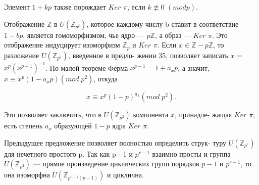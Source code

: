 \begin{mynotice} Элемент $1+kp$ также порождает $Ker$ $\pi$, если $k \not\equiv 0$ \linebreak $(mod p)$. \par

Отображение $\mathbb{Z}$ в $U({{\mathbb{Z}}_{p^{2}}})$, которое каждому числу b ставит в \linebreak соответствие $1-bp$, является гомоморфизмом, чье ядро --- $p \mathbb{Z}$, а \linebreak образ --- $Ker$ $\pi$. 
Это отображение индуцирует изоморфизм $\mathbb{Z}_{p}$ и \linebreak $Ker$ $\pi$. Если $x\in\mathbb{Z} - p\mathbb{Z}$, то разложение $U(\mathbb{Z}_{p^{2}})$, введенное в предло- \linebreak жении 35, позволяет записать $x$ = $x^{p}(x^{p-1})^{-1}$. По малой теореме \linebreak Ферма $x^{p-1}=1+a_{x}p$, а значит, $x\equiv x^{p}(1-a_{x}p) (mod \; p^{2})$, откуда \par  
\vspace{\baselineskip}
$$ x\equiv x^{p}(1-p)^{a_{x}} (mod \; p^2). $$ \par
\vspace{\baselineskip}
\noindent Это позволяет заключить, что в $U(\mathbb{Z}_{p^{2}})$ компонента $x$, принадле- \linebreak жащая $Ker$ $\pi$, есть степень $a_{x}$ образующей $1-p$ ядра $Ker$ $\pi$. \par
\vspace{\baselineskip}
\end{mynotice}
Предыдущее предложение позволяет полностью определить струк- \linebreak туру $U(\mathbb{Z}_{p^{r}})$ для нечетного простого p. Так как p - 1 и $p^{r-1}$ взаимно \linebreak просты и группа $U(\mathbb{Z}_{p^{2}})$ --- прямое произведение циклических групп \linebreak порядков $p-1$ и $p^{r-1}$, то она изоморфна $U(\mathbb{Z}_{p^{r-1}(p-1)})$ и циклична. \par
 
